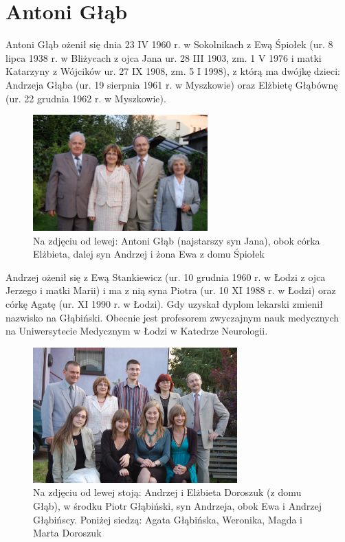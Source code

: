 \section{Antoni Głąb}
Antoni Głąb ożenił się dnia 23 IV 1960 r. w Sokolnikach z Ewą Śpiołek (ur. 8 lipca 1938 r. w Bliżycach z ojca Jana ur. 28 III 1903, zm. 1 V 1976 i matki Katarzyny z Wójcików ur. 27 IX 1908, zm. 5 I 1998), z którą ma dwójkę dzieci: Andrzeja Głąba (ur. 19 sierpnia 1961 r. w Myszkowie) oraz Elżbietę Głąbównę (ur. 22 grudnia 1962 r. w Myszkowie).


\begin{figure}[!h]
\begin{center}
\includegraphics[width=0.6\textwidth]{zdjecia/ewa_antoni_glab_z_dziecmi.jpg}
\caption[Antoni Głąb z żoną i dziećmi]{Na zdjęciu od lewej: Antoni Głąb (najstarszy syn Jana), obok córka Elżbieta, dalej syn Andrzej i żona Ewa z domu Śpiołek}
\label{rys:ewa_antoni_glab_z_dziecmi}
\end{center}
\end{figure}

Andrzej ożenił się z Ewą Stankiewicz (ur. 10 grudnia 1960 r. w Łodzi z ojca Jerzego i matki Marii) i ma z nią syna Piotra (ur. 10 XI 1988 r. w Łodzi) oraz córkę Agatę (ur. XI 1990 r. w Łodzi). Gdy uzyskał dyplom lekarski zmienił nazwisko na Głąbiński. Obecnie jest profesorem zwyczajnym nauk medycznych na Uniwersytecie Medycznym w Łodzi w Katedrze Neurologii.

\begin{figure}[!h]
\begin{center}
\includegraphics[width=0.7\textwidth]{zdjecia/elzbieta_anrzej_glab_z_dziecmi.jpg}
\caption[Elżbieta Doroszuk i Andrzej Głąbiński z rodzinami]{Na zdjęciu od lewej stoją: Andrzej i Elżbieta Doroszuk (z domu Głąb), w środku Piotr Głąbiński, syn Andrzeja, obok Ewa i Andrzej Głąbińscy. Poniżej siedzą: Agata Głąbińska, Weronika, Magda i Marta Doroszuk}
\label{rys:elzbieta_anrzej_glab_z_dziecmi}
\end{center}
\end{figure}

